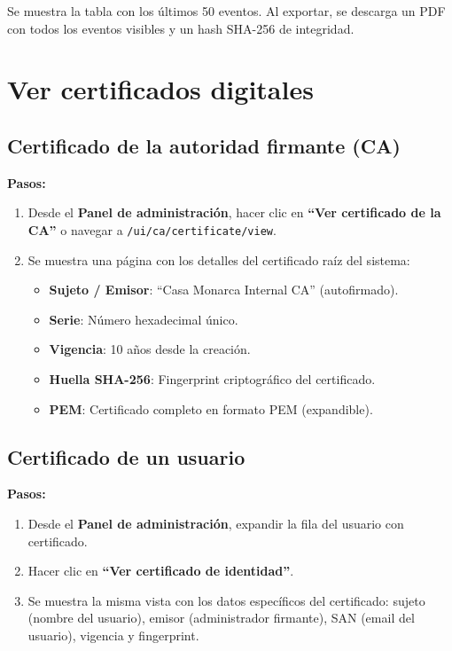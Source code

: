 \documentclass[10pt,letterpaper]{report}
\begin{document}
\begin{successbox}
  Se muestra la tabla con los últimos 50 eventos. Al exportar, se descarga un PDF con todos los eventos visibles y un hash SHA-256 de integridad.
\end{successbox}

\section{Ver certificados digitales}

\subsection{Certificado de la autoridad firmante (CA)}

\textbf{Pasos:}
\begin{enumerate}[leftmargin=2cm]
  \item Desde el \textbf{Panel de administración}, hacer clic en \textbf{``Ver certificado de la CA''} o navegar a \texttt{/ui/ca/certificate/view}.
  \item Se muestra una página con los detalles del certificado raíz del sistema:
  \begin{itemize}
    \item \textbf{Sujeto / Emisor}: ``Casa Monarca Internal CA'' (autofirmado).
    \item \textbf{Serie}: Número hexadecimal único.
    \item \textbf{Vigencia}: 10 años desde la creación.
    \item \textbf{Huella SHA-256}: Fingerprint criptográfico del certificado.
    \item \textbf{PEM}: Certificado completo en formato PEM (expandible).
  \end{itemize}
\end{enumerate}

\subsection{Certificado de un usuario}

\textbf{Pasos:}
\begin{enumerate}[leftmargin=2cm]
  \item Desde el \textbf{Panel de administración}, expandir la fila del usuario con certificado.
  \item Hacer clic en \textbf{``Ver certificado de identidad''}.
  \item Se muestra la misma vista con los datos específicos del certificado: sujeto (nombre del usuario), emisor (administrador firmante), SAN (email del usuario), vigencia y fingerprint.
\end{enumerate}
\end{document}
